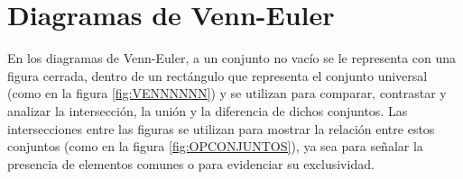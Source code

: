 \newpage

\section{Diagramas de Venn-Euler}

\noindent
\begin{minipage}[c]{0.5\textwidth}
    \hspace*{5.5mm}En los diagramas de Venn-Euler, a un conjunto no vacío se le representa con una figura cerrada, dentro de un rectángulo que representa el conjunto universal (como en la figura \ref{fig:VENNNNNN}) y se utilizan para comparar, contrastar y analizar la intersección, la unión y la diferencia de dichos conjuntos. Las intersecciones entre las figuras se utilizan para mostrar la relación entre estos conjuntos (como en la figura \ref{fig:OPCONJUNTOS}), ya sea para señalar la presencia de elementos comunes o para evidenciar su exclusividad.
\end{minipage}\hfill
\begin{minipage}[c]{0.47\textwidth}
    \begin{center}
        \label{fig:VENNNNNN}
    \end{center}
\end{minipage}

\def\firstcircle{(0,0) circle (1.5cm)}
\def\secondcircle{(0:2cm) circle (1.5cm)}



